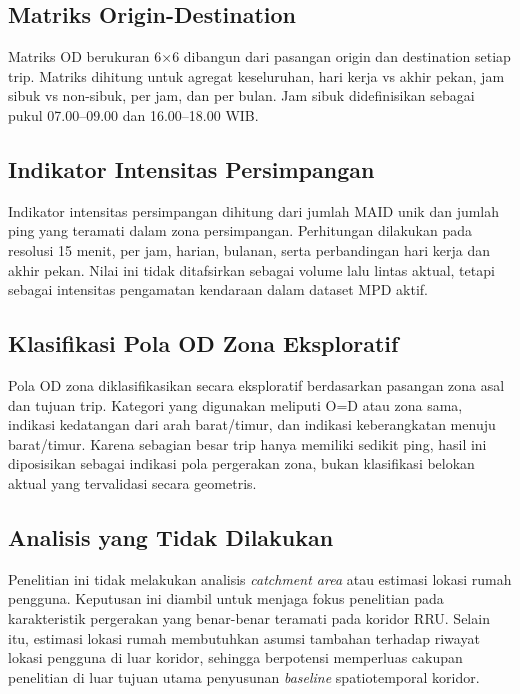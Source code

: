 \subsection{Matriks Origin-Destination}

Matriks OD berukuran 6×6 dibangun dari pasangan origin dan destination setiap trip. Matriks dihitung untuk agregat keseluruhan, hari kerja vs akhir pekan, jam sibuk vs non-sibuk, per jam, dan per bulan. Jam sibuk didefinisikan sebagai pukul 07.00--09.00 dan 16.00--18.00 WIB.

\subsection{Indikator Intensitas Persimpangan}

Indikator intensitas persimpangan dihitung dari jumlah MAID unik dan jumlah ping yang teramati dalam zona persimpangan. Perhitungan dilakukan pada resolusi 15 menit, per jam, harian, bulanan, serta perbandingan hari kerja dan akhir pekan. Nilai ini tidak ditafsirkan sebagai volume lalu lintas aktual, tetapi sebagai intensitas pengamatan kendaraan dalam dataset MPD aktif.

\subsection{Klasifikasi Pola OD Zona Eksploratif}

Pola OD zona diklasifikasikan secara eksploratif berdasarkan pasangan zona asal dan tujuan trip. Kategori yang digunakan meliputi O=D atau zona sama, indikasi kedatangan dari arah barat/timur, dan indikasi keberangkatan menuju barat/timur. Karena sebagian besar trip hanya memiliki sedikit ping, hasil ini diposisikan sebagai indikasi pola pergerakan zona, bukan klasifikasi belokan aktual yang tervalidasi secara geometris.

\subsection{Analisis yang Tidak Dilakukan}

Penelitian ini tidak melakukan analisis \textit{catchment area} atau estimasi lokasi rumah pengguna. Keputusan ini diambil untuk menjaga fokus penelitian pada karakteristik pergerakan yang benar-benar teramati pada koridor RRU. Selain itu, estimasi lokasi rumah membutuhkan asumsi tambahan terhadap riwayat lokasi pengguna di luar koridor, sehingga berpotensi memperluas cakupan penelitian di luar tujuan utama penyusunan \textit{baseline} spatiotemporal koridor.

